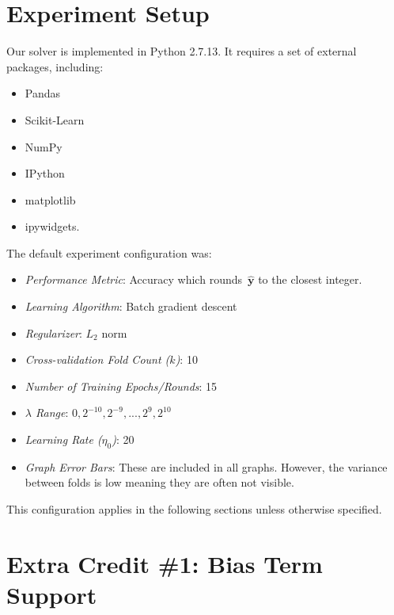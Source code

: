 \documentclass{report}
\newcommand{\yhat}{\hat{\mathbf{y}}}
\begin{document}
  
  \section{Experiment Setup}\label{sec:experimentSetup}
  
  Our solver is implemented in Python 2.7.13.  It requires a set of external packages, including: 
  
  \begin{multicols}{2}
    \begin{itemize}
      \setlength\itemsep{0pt}
      \item Pandas
      \item Scikit-Learn
      \item NumPy
      \item IPython
      \item matplotlib
      \item ipywidgets\textrm{.}
    \end{itemize}
  \end{multicols}

  The default experiment configuration was:
  
  \begin{itemize}
    \item \textit{Performance Metric}: Accuracy which rounds~$\yhat$ to the closest integer.
    \item \textit{Learning Algorithm}: Batch gradient descent
    \item \textit{Regularizer}: $L_2$ norm
    \item \textit{Cross-validation Fold Count ($k$)}: 10
    \item \textit{Number of Training Epochs/Rounds}: 15
    \item \textit{$\lambda$ Range}: $0,2^{-10},2^{-9},...,2^{9},2^{10}$
    \item \textit{Learning Rate ($\eta_0$)}: 20
    \item \textit{Graph Error Bars}: These are included in all graphs.  However, the variance between folds is low meaning they are often not visible.
  \end{itemize}

  This configuration applies in the following sections unless otherwise specified.

  \section{Extra Credit \#1: Bias Term Support}
  
\end{document}
